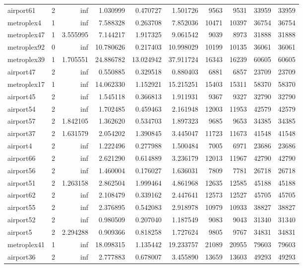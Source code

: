 \begin{longtable}{|l|r|r|r|r|r|r|r|r|r|}
airport61 & 2 & inf & 1.030999 & 0.470727 & 1.501726 & 9563 & 9531 & 33959 & 33959 \\
metroplex4 & 1 & inf & 7.588328 & 0.263708 & 7.852036 & 10471 & 10397 & 36754 & 36754 \\
metroplex47 & 1 & 3.555995 & 7.144217 & 1.917325 & 9.061542 & 9039 & 8973 & 31888 & 31888 \\
metroplex92 & 0 & inf & 10.780626 & 0.217403 & 10.998029 & 10199 & 10135 & 36061 & 36061 \\
metroplex39 & 1 & 1.705551 & 24.886782 & 13.024942 & 37.911724 & 16343 & 16239 & 60605 & 60605 \\
airport47 & 2 & inf & 0.550885 & 0.329518 & 0.880403 & 6881 & 6857 & 23709 & 23709 \\
metroplex17 & 1 & inf & 14.062330 & 1.152921 & 15.215251 & 15403 & 15311 & 58370 & 58370 \\
airport45 & 2 & inf & 1.545118 & 0.366813 & 1.911931 & 9367 & 9327 & 32790 & 32790 \\
airport54 & 2 & inf & 1.702485 & 0.459463 & 2.161948 & 12003 & 11953 & 42579 & 42579 \\
airport57 & 2 & 1.842105 & 1.362620 & 0.534703 & 1.897323 & 9685 & 9653 & 34385 & 34385 \\
airport37 & 2 & 1.631579 & 2.054202 & 1.390845 & 3.445047 & 11723 & 11673 & 41548 & 41548 \\
airport4 & 2 & inf & 1.222496 & 0.277988 & 1.500484 & 7005 & 6971 & 23686 & 23686 \\
airport66 & 2 & inf & 2.621290 & 0.614889 & 3.236179 & 12013 & 11967 & 42790 & 42790 \\
airport56 & 2 & inf & 1.460004 & 0.176027 & 1.636031 & 7809 & 7781 & 26718 & 26718 \\
airport51 & 2 & 1.263158 & 2.862504 & 1.999464 & 4.861968 & 12635 & 12585 & 45188 & 45188 \\
airport62 & 2 & inf & 2.108479 & 0.339162 & 2.447641 & 12573 & 12527 & 45705 & 45705 \\
airport55 & 2 & inf & 2.376895 & 0.542083 & 2.918978 & 10979 & 10933 & 38827 & 38827 \\
airport52 & 2 & inf & 0.980509 & 0.207040 & 1.187549 & 9083 & 9043 & 31340 & 31340 \\
airport5 & 2 & 2.294288 & 0.909366 & 0.818258 & 1.727624 & 9805 & 9767 & 34831 & 34831 \\
metroplex41 & 1 & inf & 18.098315 & 1.135442 & 19.233757 & 21089 & 20955 & 79603 & 79603 \\
airport36 & 2 & inf & 2.777883 & 0.678007 & 3.455890 & 13659 & 13603 & 49293 & 49293 \\

\end{longtable}
